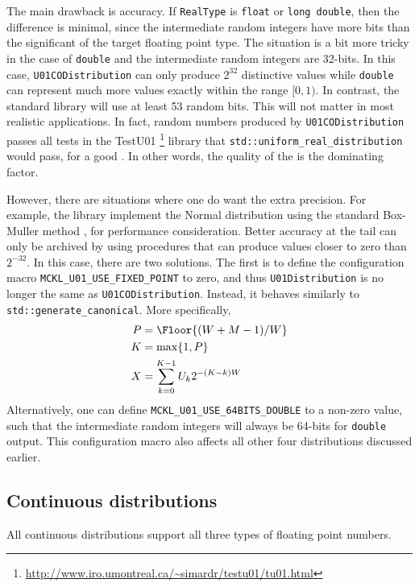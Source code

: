The main drawback is accuracy. If \verb|RealType| is \verb|float| or
\verb|long double|, then the difference is minimal, since the intermediate
random integers have more bits than the significant of the target floating
point type. The situation is a bit more tricky in the case of \verb|double| and
the intermediate random integers are 32-bits. In this case,
\verb|U01CODistribution| can only produce $2^{32}$ distinctive values while
\verb|double| can represent much more values exactly within the range $[0, 1)$.
In contrast, the standard library will use at least 53 random bits. This will
not matter in most realistic applications. In fact, random numbers produced by
\verb|U01CODistribution| passes all tests in the {\lnfigures\tbfigures
  TestU01}%
\footnote{\url{http://www.iro.umontreal.ca/~simardr/testu01/tu01.html}} library
that \verb|std::uniform_real_distribution| would pass, for a good \rng. In
other words, the quality of the \rng is the dominating factor.

However, there are situations where one do want the extra precision. For
example, the library implement the Normal distribution using the standard
Box-Muller method \parencite{Box:1958hv}, for performance consideration. Better
accuracy at the tail can only be archived by using procedures that can produce
values closer to zero than $2^{-32}$. In this case, there are two solutions.
The first is to define the configuration macro
\verb|MCKL_U01_USE_FIXED_POINT| to zero, and thus \verb|U01Distribution| is no
longer the same as \verb|U01CODistribution|. Instead, it behaves similarly to
\verb|std::generate_canonical|. More specifically,
\begin{align*}
  P &= \Floor{(W + M - 1) / W} \\
  K &= \max\{1, P\} \\
  X &= \sum_{k=0}^{K - 1} U_k 2^{-(K - k)W}
\end{align*}
Alternatively, one can define \verb|MCKL_U01_USE_64BITS_DOUBLE| to a non-zero
value, such that the intermediate random integers will always be 64-bits for
\verb|double| output. This configuration macro also affects all other four
distributions discussed earlier.

\subsection{Continuous distributions}
\label{sub:Continuous distributions}

All continuous distributions support all three types of floating point numbers.

